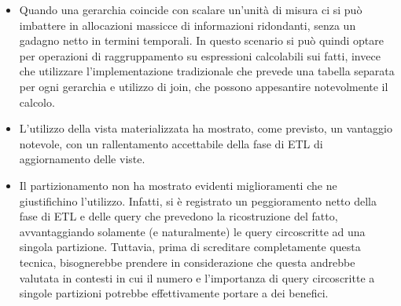 \begin{itemize}
	\item Quando una gerarchia coincide con scalare un'unità di misura ci si può imbattere in allocazioni massicce di informazioni ridondanti, senza un gadagno netto in termini temporali. In questo scenario si può quindi optare per operazioni di raggruppamento su espressioni	calcolabili sui fatti, invece che utilizzare l’implementazione tradizionale che prevede una tabella separata per ogni gerarchia e utilizzo di join, che possono appesantire notevolmente il calcolo.
	\item L’utilizzo della vista materializzata ha mostrato, come previsto, un vantaggio notevole, con un rallentamento accettabile della fase di ETL di aggiornamento delle viste.
	\item Il partizionamento non ha mostrato evidenti miglioramenti che ne giustifichino l’utilizzo. Infatti, si è registrato un peggioramento netto della fase di ETL e delle query che prevedono la ricostruzione del fatto, avvantaggiando solamente (e naturalmente) le query circoscritte ad una singola partizione. Tuttavia, prima di screditare completamente questa tecnica, bisognerebbe prendere in considerazione che questa andrebbe valutata
	in contesti in cui il numero e l’importanza di query circoscritte a singole partizioni potrebbe effettivamente portare a dei benefici.
\end{itemize}